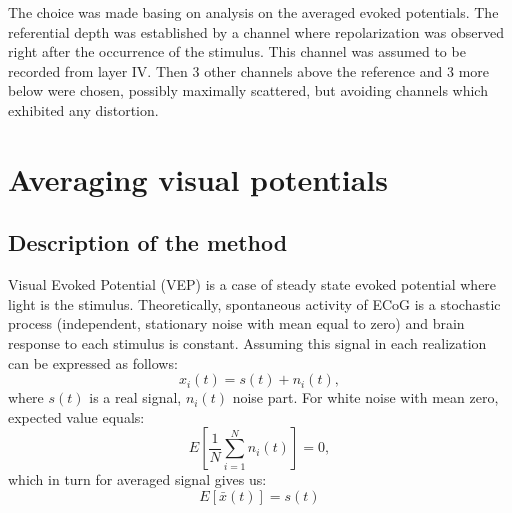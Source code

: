 \documentclass{pracalicmgr}
\begin{document}
   The choice was made basing on analysis on the averaged evoked potentials. The referential depth was established by a channel where repolarization was observed right after the occurrence of the stimulus. This channel was assumed to be recorded from layer IV. Then 3 other channels above the reference and 3 more below were chosen, possibly maximally scattered, but avoiding channels which exhibited any distortion.
   
   
   \section{Averaging visual potentials}
   
   \subsection{Description of the method}
   Visual Evoked Potential (VEP) is a case of steady state evoked potential where light is the stimulus. Theoretically, spontaneous activity of ECoG is a stochastic process (independent, stationary noise with mean equal to zero) and brain response to each stimulus is constant. 
   Assuming this signal in each realization can be expressed as follows:
   \begin{equation}
   x_i(t) = s(t) + n_i(t),
   \end{equation}
   where $s(t)$ is a real signal, $n_i(t)$ noise part. For white noise with mean zero, expected value equals:
   \begin{equation}
   E\left[ \frac{1}{N}\sum_{i=1}^{N} n_i(t)\right] = 0, 
   \end{equation}
   which in turn for averaged signal gives us:
   \begin{equation}
   E\left[ \bar{x}(t) \right] = s(t)
   \end{equation}
   
\end{document}
